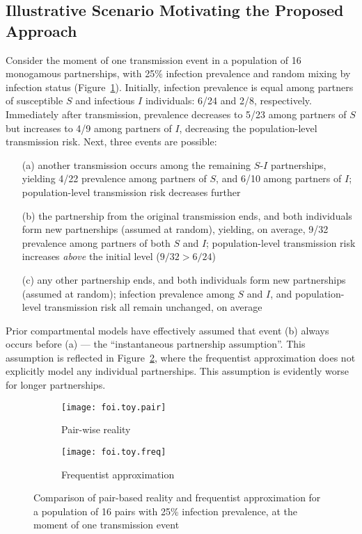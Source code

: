 \subsection{Illustrative Scenario Motivating the Proposed Approach}\label{sr.foi.toy}
Consider the moment of one transmission event
in a population of 16 monogamous partnerships, with 25\% infection prevalence
and random mixing by infection status (Figure~\ref{fig:foi.toy.pair}).
Initially, infection prevalence is equal among partners of
susceptible $S$ and infectious $I$ individuals: 6/24 and 2/8, respectively.
Immediately after transmission,
prevalence decreases to 5/23 among partners of $S$ but increases to 4/9 among partners of $I$,
decreasing the population-level transmission risk.
Next, three events are possible:
\begin{enumerate}
  \item[(a)] \label{toy.e.t}
  another transmission occurs among the remaining $S$-$I$ partnerships,
  yielding 4/22 prevalence among partners of $S$, and 6/10 among partners of $I$;
  population-level transmission risk decreases further
  \item[(b)] \label{toy.e.p}
  the partnership from the original transmission ends,
  and both individuals form new partnerships (assumed at random),
  yielding, on average, 9/32 prevalence among partners of both $S$ and $I$;
  population-level transmission risk increases \emph{above} the initial level ($9/32 > 6/24$)
  \item[(c)] \label{toy.e.q}
  any other partnership ends,
  and both individuals form new partnerships (assumed at random);
  infection prevalence among $S$ and $I$, and population-level transmission risk
  all remain unchanged, on average
\end{enumerate}
Prior compartmental models have effectively assumed that
event (b) always occurs before (a)
--- \ie the ``instantaneous partnership assumption''.
This assumption is reflected in Figure~\ref{fig:foi.toy.freq},
where the frequentist approximation does not explicitly model any individual partnerships.
This assumption is evidently worse for longer partnerships.
\begin{figure}
  \begin{subfigure}{.5\linewidth}
    \centering\texttt{[image: foi.toy.pair]}
    \caption{Pair-wise reality}
    \label{fig:foi.toy.pair}
  \end{subfigure}%
  \begin{subfigure}{.5\linewidth}
    \centering\texttt{[image: foi.toy.freq]}
    \caption{Frequentist approximation}
    \label{fig:foi.toy.freq}
  \end{subfigure}
  \caption{Comparison of pair-based reality and frequentist approximation
    for a population of 16 pairs with 25\% infection prevalence,
    at the moment of one transmission event}
  \label{fig:foi.toy}
\end{figure}
